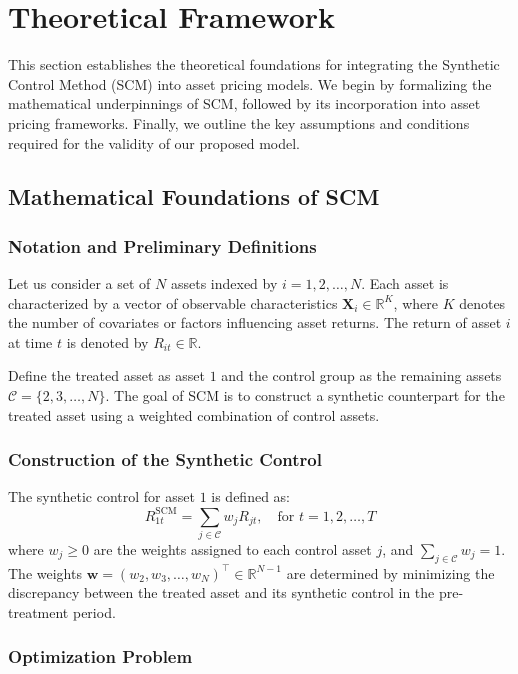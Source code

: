 \section{Theoretical Framework}

This section establishes the theoretical foundations for integrating the Synthetic Control Method (SCM) into asset pricing models. We begin by formalizing the mathematical underpinnings of SCM, followed by its incorporation into asset pricing frameworks. Finally, we outline the key assumptions and conditions required for the validity of our proposed model.

\subsection{Mathematical Foundations of SCM}

\subsubsection{Notation and Preliminary Definitions}

Let us consider a set of $N$ assets indexed by $i = 1, 2, \dots, N$. Each asset is characterized by a vector of observable characteristics $\mathbf{X}_i \in \mathbb{R}^K$, where $K$ denotes the number of covariates or factors influencing asset returns. The return of asset $i$ at time $t$ is denoted by $R_{it} \in \mathbb{R}$.

Define the treated asset as asset $1$ and the control group as the remaining assets $\mathcal{C} = \{2, 3, \dots, N\}$. The goal of SCM is to construct a synthetic counterpart for the treated asset using a weighted combination of control assets.

\subsubsection{Construction of the Synthetic Control}

The synthetic control for asset $1$ is defined as:
\[
R_{1t}^{\text{SCM}} = \sum_{j \in \mathcal{C}} w_j R_{jt}, \quad \text{for } t = 1, 2, \dots, T
\]
where $w_j \geq 0$ are the weights assigned to each control asset $j$, and $\sum_{j \in \mathcal{C}} w_j = 1$. The weights $\mathbf{w} = (w_2, w_3, \dots, w_N)^\top \in \mathbb{R}^{N-1}$ are determined by minimizing the discrepancy between the treated asset and its synthetic control in the pre-treatment period.

\subsubsection{Optimization Problem}

